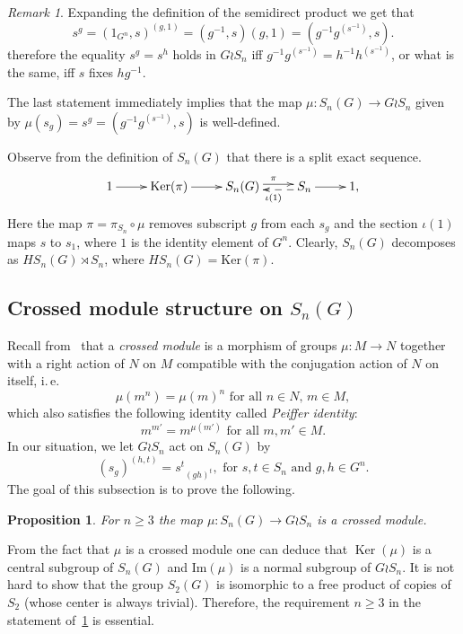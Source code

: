 \documentclass[oneside, 10pt]{amsart}
\theoremstyle{plain}
\numberwithin{equation}{section}
\numberwithin{lemma}{section}
\newtheorem{prop}[lemma]{Proposition}
\theoremstyle{remark}
\newtheorem{rem}[lemma]{Remark}
\theoremstyle{definition}
\DeclareMathOperator{\Ker}{Ker}
\begin{document}
\begin{rem}
Expanding the definition of the semidirect product we get that
\begin{equation} \nonumber s^g = (1_{G^n}, s)^{(g, 1)} = (g^{-1}, s) (g, 1) = (g^{-1} g^{(s^{-1})}, s). \end{equation}
therefore the equality $s^g = s^h$ holds in $G \wr S_n$ iff
$g^{-1} g^{(s^{-1})} = h^{-1} h^{(s^{-1})}$, or what is the same, iff $s$ fixes $hg^{-1}$.

The last statement immediately implies that the map $\mu \colon S_n(G) \to G \wr S_n$ given by $\mu(s_g) = s^g = (g^{-1}g^{(s^{-1})}, s)$ is well-defined.
\end{rem}

Observe from the definition of $S_n(G)$ that there is a split exact sequence.
\begin{equation} \label{eq:ex-seq} \xymatrix{1 \ar[r] & \mathrm{Ker}(\pi) \ar[r] &  S_n(G) \ar@<0.5ex>[r]^{\pi} & S_n \ar[r] \ar@{-->}@<0.5ex>[l]^{\iota(1)} & 1,} \end{equation}
Here the map $\pi = \pi_{S_n} \circ \mu$ removes subscript $g$ from each $s_g$ and the section $\iota(1)$ maps $s$ to $s_1$, where $1$ is the identity element of $G^n$.
Clearly, $S_n(G)$ decomposes as $HS_n(G) \rtimes S_n$, where $HS_n(G) = \mathrm{Ker}(\pi)$.

\subsection{Crossed module structure on $S_n(G)$}
Recall from~\cite[\S~2.2]{BHS11} that a {\it crossed module} is a morphism of groups $\mu\colon M\to N$ together with a right action of $N$ on $M$ 
compatible with the conjugation action of $N$ on itself, i.\,e.
\begin{equation} \label{eq:precrossed} \tag{CM1} \mu(m^n) = \mu(m)^n \text{ for all $n \in N$, $m \in M$}, \end{equation}
which also satisfies the following identity called {\it Peiffer identity}:
\begin{equation} \label{eq:Peiffer} \tag{CM2} m^{m'} = m^{\mu(m')} \text{ for all $m, m' \in M$}.\end{equation}
In our situation, we let $G \wr S_n$ act on $S_n(G)$ by 
\begin{equation} \label{eq:action} (s_g)^{(h, t)} = {s^t}_{(gh)^t}, \text{ for $s, t \in S_n$ and $g, h \in G^n$.} \end{equation}
The goal of this subsection is to prove the following.
\begin{prop} \label{thm:cms} For $n \geq 3$ the map $\mu \colon S_n(G) \to G \wr S_n $ is a crossed module. \end{prop}
From the fact that $\mu$ is a crossed module one can deduce that $\Ker(\mu)$ is a central subgroup of $S_n(G)$ and $\mathrm{Im}(\mu)$ is a normal subgroup of $G \wr S_n$.
It is not hard to show that the group $S_2(G)$ is isomorphic to a free product of copies of $S_2$ (whose center is always trivial).
Therefore, the requirement $n\geq 3$ in the statement of~\cref{thm:cms} is essential.
\end{document}
